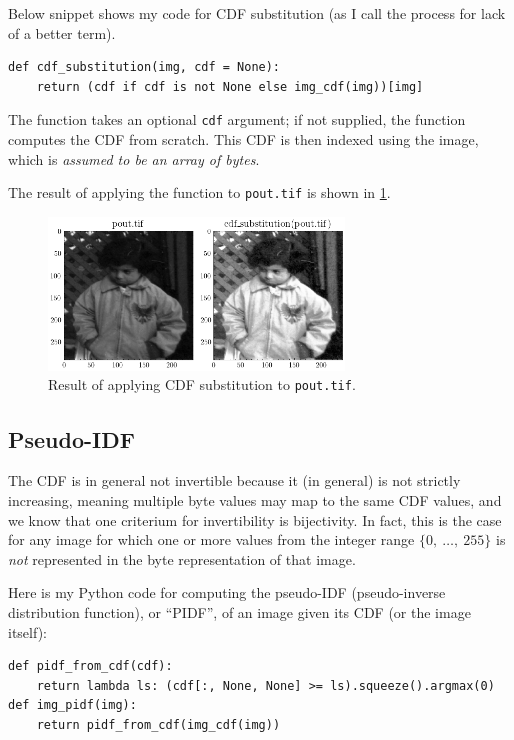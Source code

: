 Below snippet shows my code for CDF substitution (as I call the process for lack
of a better term).

\begin{verbatim}
def cdf_substitution(img, cdf = None):
    return (cdf if cdf is not None else img_cdf(img))[img]
\end{verbatim}

The function takes an optional \texttt{cdf} argument; if not supplied, the
function computes the CDF from scratch. This CDF is then indexed using the
image, which is \emph{assumed to be an array of bytes}.

The result of applying the function to \texttt{pout.tif} is shown in
\cref{fig:3.2}.


\begin{figure}[H]
    \centering
    \includegraphics[width=0.7\textwidth]{figures/task_3_2.png}
    \caption{Result of applying CDF substitution to \texttt{pout.tif}.}
    \label{fig:3.2}
\end{figure}

\subsection{Pseudo-IDF}

The CDF is in general not invertible because it (in general) is not strictly
increasing, meaning multiple byte values may map to the same CDF values, and we
know that one criterium for invertibility is bijectivity. In fact, this is the
case for any image for which one or more values from the integer range $\{0,\
\dots,\ 255\}$ is \emph{not} represented in the byte representation of that
image.

Here is my Python code for computing the pseudo-IDF (pseudo-inverse distribution
function), or ``PIDF'', of an image given its CDF (or the image itself):
\begin{verbatim}
def pidf_from_cdf(cdf):
    return lambda ls: (cdf[:, None, None] >= ls).squeeze().argmax(0)
def img_pidf(img):
    return pidf_from_cdf(img_cdf(img))
\end{verbatim}

